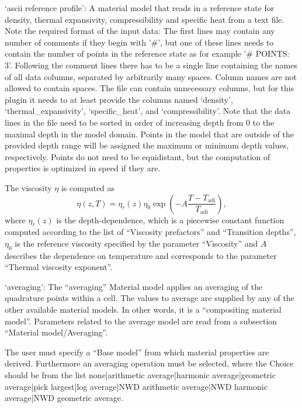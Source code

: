 \begin{itemize}
`ascii reference profile': A material model that reads in a reference state for density, thermal expansivity, compressibility and specific heat from a text file. 
Note the required format of the input data: The first lines may contain any number of comments if they begin with '\#', but one of these lines needs to contain the number of points in the reference state as for example '\# POINTS: 3'. Following the comment lines there has to be a single line containing the names of all data columns, separated by arbitrarily many spaces. Column names are not allowed to contain spaces. The file can contain unnecessary columns, but for this plugin it needs to at least provide the columns named `density', `thermal\_expansivity', `specific\_heat', and `compressibility'. Note that the data lines in the file need to be sorted in order of increasing depth from 0 to the maximal depth in the model domain. Points in the model that are outside of the provided depth range will be assigned the maximum or minimum depth values, respectively. Points do not need to be equidistant, but the computation of properties is optimized in speed if they are.

The viscosity $\eta$ is computed as \begin{equation}\eta(z,T) = \eta_r(z) \eta_0 \exp\left(-A \frac{T - T_\text{adi}}{T_\text{adi}}\right),\end{equation}where $\eta_r(z)$ is the depth-dependence, which is a piecewise constant function computed according to the list of ``Viscosity prefactors'' and ``Transition depths'', $\eta_0$ is the reference viscosity specified by the parameter ``Viscosity'' and $A$ describes the dependence on temperature and corresponds to the parameter ``Thermal viscosity exponent''.

`averaging': The ``averaging'' Material model applies an averaging of the quadrature points within a cell. The values to average are supplied by any of the other available material models. In other words, it is a ``compositing material model''. Parameters related to the average model are read from a subsection ``Material model/Averaging''.

The user must specify a ``Base model'' from which material properties are derived. Furthermore an averaging operation must be selected, where the Choice should be from the list none|arithmetic average|harmonic average|geometric average|pick largest|log average|NWD arithmetic average|NWD harmonic average|NWD geometric average.


\end{itemize}
